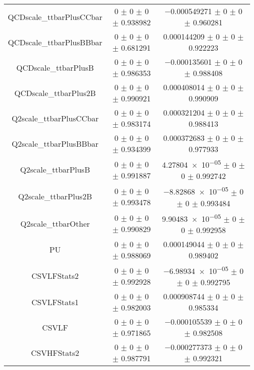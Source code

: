 \begin{table}
\begin{tabular}{ccc}
QCDscale\_ttbarPlusCCbar & \num{0} $\pm$ \num{0} $\pm$ \num{0} $\pm$ \num{0.938982} & \num{-0.000549271} $\pm$ \num{0} $\pm$ \num{0} $\pm$ \num{0.960281}\\
QCDscale\_ttbarPlusBBbar & \num{0} $\pm$ \num{0} $\pm$ \num{0} $\pm$ \num{0.681291} & \num{0.000144209} $\pm$ \num{0} $\pm$ \num{0} $\pm$ \num{0.922223}\\
QCDscale\_ttbarPlusB & \num{0} $\pm$ \num{0} $\pm$ \num{0} $\pm$ \num{0.986353} & \num{-0.000135601} $\pm$ \num{0} $\pm$ \num{0} $\pm$ \num{0.988408}\\
QCDscale\_ttbarPlus2B & \num{0} $\pm$ \num{0} $\pm$ \num{0} $\pm$ \num{0.990921} & \num{0.000408014} $\pm$ \num{0} $\pm$ \num{0} $\pm$ \num{0.990909}\\
Q2scale\_ttbarPlusCCbar & \num{0} $\pm$ \num{0} $\pm$ \num{0} $\pm$ \num{0.983174} & \num{0.000321204} $\pm$ \num{0} $\pm$ \num{0} $\pm$ \num{0.988413}\\
Q2scale\_ttbarPlusBBbar & \num{0} $\pm$ \num{0} $\pm$ \num{0} $\pm$ \num{0.934399} & \num{0.000372683} $\pm$ \num{0} $\pm$ \num{0} $\pm$ \num{0.977933}\\
Q2scale\_ttbarPlusB & \num{0} $\pm$ \num{0} $\pm$ \num{0} $\pm$ \num{0.991887} & \num{4.27804e-05} $\pm$ \num{0} $\pm$ \num{0} $\pm$ \num{0.992742}\\
Q2scale\_ttbarPlus2B & \num{0} $\pm$ \num{0} $\pm$ \num{0} $\pm$ \num{0.993478} & \num{-8.82868e-05} $\pm$ \num{0} $\pm$ \num{0} $\pm$ \num{0.993484}\\
Q2scale\_ttbarOther & \num{0} $\pm$ \num{0} $\pm$ \num{0} $\pm$ \num{0.990829} & \num{9.90483e-05} $\pm$ \num{0} $\pm$ \num{0} $\pm$ \num{0.992958}\\
PU & \num{0} $\pm$ \num{0} $\pm$ \num{0} $\pm$ \num{0.988069} & \num{0.000149044} $\pm$ \num{0} $\pm$ \num{0} $\pm$ \num{0.989402}\\
CSVLFStats2 & \num{0} $\pm$ \num{0} $\pm$ \num{0} $\pm$ \num{0.992928} & \num{-6.98934e-05} $\pm$ \num{0} $\pm$ \num{0} $\pm$ \num{0.992795}\\
CSVLFStats1 & \num{0} $\pm$ \num{0} $\pm$ \num{0} $\pm$ \num{0.982003} & \num{0.000908744} $\pm$ \num{0} $\pm$ \num{0} $\pm$ \num{0.985334}\\
CSVLF & \num{0} $\pm$ \num{0} $\pm$ \num{0} $\pm$ \num{0.971865} & \num{-0.000105539} $\pm$ \num{0} $\pm$ \num{0} $\pm$ \num{0.982508}\\
CSVHFStats2 & \num{0} $\pm$ \num{0} $\pm$ \num{0} $\pm$ \num{0.987791} & \num{-0.000277373} $\pm$ \num{0} $\pm$ \num{0} $\pm$ \num{0.992321}\\

\end{tabular}
\end{table}
